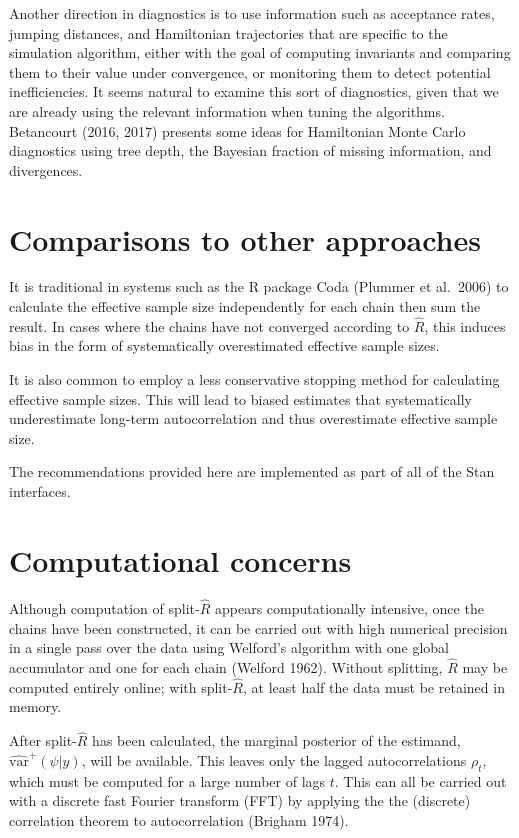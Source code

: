 \documentclass[11pt]{article}
\begin{document}
Another direction in diagnostics is to use information such as acceptance rates, jumping distances, and Hamiltonian trajectories that are specific to the simulation algorithm, either with the goal of computing invariants and comparing them to their value under convergence, or monitoring them to detect potential inefficiencies.  It seems natural to examine this sort of diagnostics, given that we are already using the relevant information when tuning the algorithms.  Betancourt (2016, 2017) presents some ideas for Hamiltonian Monte Carlo diagnostics using tree depth, the Bayesian fraction of missing information, and divergences.

\section{Comparisons to other approaches}

It is traditional in systems such as the R package Coda (Plummer et al.~2006) to calculate the effective sample size independently for each chain then sum the result.  In cases where the chains have not converged according to $\widehat{R}$, this induces bias in the form of systematically overestimated effective sample sizes.

It is also common to employ a less conservative stopping method for calculating effective sample sizes.  This will lead to biased estimates that systematically underestimate long-term autocorrelation and thus overestimate effective sample size.

The recommendations provided here are implemented as part of all of the Stan interfaces.

\section{Computational concerns}

Although computation of split-$\widehat{R}$ appears computationally intensive, once the chains have been constructed, it can be carried out with high numerical precision in a single pass over the data using Welford's algorithm with one global accumulator and one for each chain (Welford 1962).  Without splitting, $\widehat{R}$ may be computed entirely online; with split-$\widehat{R}$, at least half the data must be retained in memory.

After split-$\widehat{R}$ has been calculated, the marginal posterior of the estimand, $\widehat{\mathrm{var}}^+(\psi | y)$, will be available.  This leaves only the lagged autocorrelations $\rho_t$, which must be computed for a large number of lags $t$. This can all be carried out with a discrete fast Fourier transform (FFT) by applying the the (discrete) correlation theorem to autocorrelation (Brigham 1974).
\end{document}
